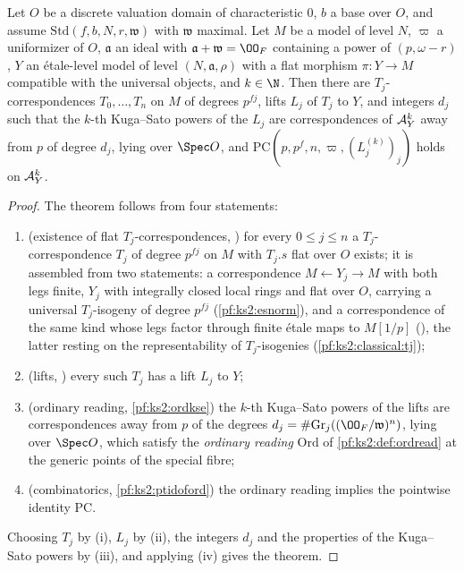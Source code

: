 \begin{theorem}\label{pf:ks2:congks}
Let $O$ be a discrete valuation domain of characteristic $0$, $b$ a base over $O$, and assume
$\mathrm{Std}(f,b,N,r,\mathfrak w)$ with $\mathfrak w$ maximal. Let $M$ be a model of level $N$,
$\varpi$ a uniformizer of $O$, $\mathfrak a$ an ideal with $\mathfrak a+\mathfrak w=\kstwoOF$
containing a power of $(p,\omega-r)$, $Y$ an \'etale-level model of level $(N,\mathfrak a,\rho)$
with a flat morphism $\pi\colon Y\to M$ compatible with the universal objects, and $k\in\N$. Then
there are $T_j$-correspondences $T_0,\dots,T_n$ on $M$ of degrees $p^{fj}$, lifts $L_j$ of $T_j$ to
$Y$, and integers $d_j$ such that the $k$-th Kuga--Sato powers of the $L_j$ are correspondences of
$\mathcal{A}_Y^k$ away from $p$ of degree $d_j$, lying over $\Spec O$, and
$\mathrm{PC}(p,p^f,n,\varpi,(L_j^{(k)})_j)$ holds on $\mathcal{A}_Y^k$.
\end{theorem}

\begin{proof}
The theorem follows from four statements:
\begin{enumerate}[label=(\roman*)]
\item (existence of flat $T_j$-correspondences,
  ) for every
  $0\le j\le n$ a $T_j$-correspondence $T_j$ of degree $p^{fj}$ on $M$ with $T_j.s$ flat over $O$
  exists; it is assembled from two statements: a correspondence $M\leftarrow Y_j\to M$ with both legs
  finite, $Y_j$ with integrally closed local rings and flat over $O$, carrying a universal
  $T_j$-isogeny of degree $p^{fj}$ (\cref{pf:ks2:esnorm}),
  and a correspondence of the same kind whose legs factor through finite \'etale maps to $M[1/p]$
  (), the latter resting on the
  representability of $T_j$-isogenies (\cref{pf:ks2:classical:tj});
\item (lifts, ) every such
  $T_j$ has a lift $L_j$ to $Y$;
\item (ordinary reading, \cref{pf:ks2:ordkse}) the $k$-th Kuga--Sato powers of the lifts are
  correspondences away from $p$ of the degrees $d_j=\#\mathrm{Gr}_j((\kstwoOF/\mathfrak w)^n)$,
  lying over $\Spec O$, which satisfy the \emph{ordinary reading} $\mathrm{Ord}$ of
  \cref{pf:ks2:def:ordread} at the generic points of the special fibre;
\item (combinatorics, \cref{pf:ks2:ptidoford}) the ordinary reading implies the pointwise
  identity $\mathrm{PC}$.
\end{enumerate}
Choosing $T_j$ by (i), $L_j$ by (ii), the integers $d_j$ and the properties of the Kuga--Sato
powers by (iii), and applying (iv) gives the theorem.
\end{proof}

